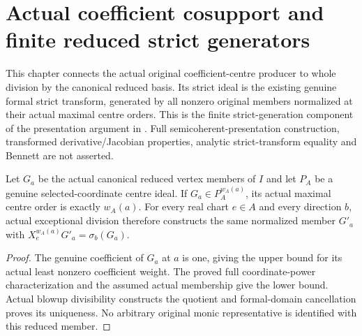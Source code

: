 \section{Actual coefficient cosupport and finite reduced strict generators}

This chapter connects the actual original coefficient-centre producer to
whole division by the canonical reduced basis. Its strict ideal is the
existing genuine formal strict transform, generated by all nonzero original
members normalized at their actual maximal centre orders. This is the
finite strict-generation component of the presentation argument in
\cite[Section 7, p.~268; Theorem 9.4, pp.~277--278]{bierstone-milman97-invent-math}.
Full semicoherent-presentation construction, transformed derivative/Jacobian
properties, analytic strict-transform equality and Bennett are not asserted.

\begin{lemma}
\label{hir:actual-reduced-vertex-centre-orders}
\leanok
Let $G_a$ be the actual canonical reduced vertex members of $I$ and let
$P_A$ be a genuine selected-coordinate centre ideal. If $G_a\in
P_A^{w_A(a)}$, its actual maximal centre order is exactly $w_A(a)$.
For every real chart $e\in A$ and every direction $b$, actual exceptional
division therefore constructs the same normalized member $G'_a$ with
$X_e^{w_A(a)}G'_a=\sigma_b(G_a)$.
\end{lemma}
\begin{proof}
The genuine coefficient of $G_a$ at $a$ is one, giving the upper bound
for its actual least nonzero coefficient weight. The proved full
coordinate-power characterization and the assumed actual membership give
the lower bound. Actual blowup divisibility constructs the quotient and
formal-domain cancellation proves its uniqueness. No arbitrary original
monic representative is identified with this reduced member.
\end{proof}

